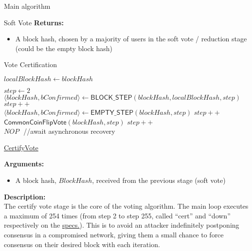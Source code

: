 \documentclass[10pt,a4paper]{article}
\begin{document}
\begin{section}{Main algorithm}
\begin{subsection}{Soft Vote}
\noindent \textbf{Returns:}
\begin{itemize}
    \item A block hash, chosen by a majority of users in the soft vote / reduction stage 
    (could be the empty block hash)
\end{itemize}

\end{subsection}
\begin{subsection}{Vote Certification}\label{ssect:certifyvote}
    \begin{algorithm}[H]
        \begin{algorithmic}[H]
        \State $localBlockHash \gets blockHash$
    
        \State $step \gets 2$
            \\
            \State $\langle blockHash, bConfirmed \rangle \gets \mathsf{BLOCK\_STEP}(blockHash, localBlockHash, step)$
            \EndIf
            \State $step++$\\
       
            \State $ \langle blockHash, bConfirmed \rangle \gets \mathsf{EMPTY\_STEP}(blockHash,step)$
            \EndIf
            \State $step++$\\
    
            \State $\mathsf{CommonCoinFlipVote}(blockHash, step)$
            \State $step++$
        \EndWhile \\
        
         \State $NOP$ ${}$ {\hskip 1cm} //await asynchronous recovery
        \EndWhile

        \EndFunction
        \end{algorithmic}
        \caption{\underline{CertifyVote}}
    \end{algorithm}
    
\noindent \textbf{Arguments:}
\begin{itemize}
    \item A block hash, $BlockHash$, received from the previous stage (soft vote)
  \end{itemize}

\noindent \textbf{Description:}\\
The certify vote stage is the core of the voting algorithm.
The main loop executes a maximum of 254 times (from step 2 to step 255, called ``cert'' and ``down'' 
respectively on the \href{https://github.com/algorandfoundation/specs}{specs.}).
This is to avoid an attacker indefinitely postponing consensus in a compromised network, giving them a 
small chance to force consensus on their desired block with each iteration.


\end{subsection}
\end{section}
\end{document}
